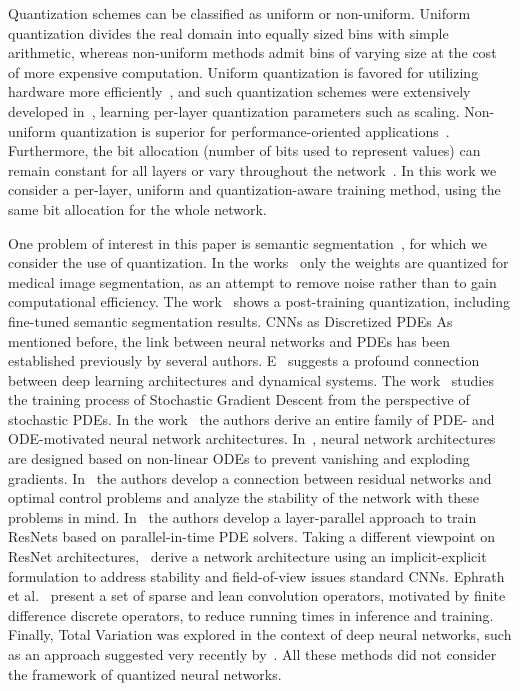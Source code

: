\documentclass[reqno]{amsart}
\makeatletter
\def\paragraph{\@startsection{paragraph}{4}%
  \z@\z@{-\fontdimen2\font}%
  {\normalfont\bfseries}}
\makeatother
\begin{document}
Quantization schemes can be classified as uniform or non-uniform. Uniform quantization divides the real domain into equally sized bins with simple arithmetic, whereas non-uniform methods admit bins of varying size at the cost of more expensive computation. Uniform quantization is favored for utilizing hardware more efficiently~\cite{han2016deep,yin2019blended}, and such quantization schemes were extensively developed in~\cite{drfn,zhang2018lqnets,choi2018pact,jin2020scaleadjusted}, learning per-layer quantization parameters such as scaling.
Non-uniform quantization is superior for performance-oriented applications~\cite{li2019apot,jung2019learning}. Furthermore, the bit allocation (number of bits used to represent values) can remain constant for all layers or vary throughout the network~\cite{bodner2021gradfreebits}. In this work we consider a per-layer, uniform and quantization-aware training method, using the same bit allocation for the whole network.

One problem of interest in this paper is semantic segmentation~\cite{chen2017atrous}, for which we consider the use of quantization. In the works~\cite{uhlich2020mpd, xu2018biomedical} only the weights are quantized for medical image segmentation, as an attempt to remove noise rather than to gain computational efficiency. The work~\cite{yuang2021zaq} shows a post-training quantization, including fine-tuned semantic segmentation results.
\bigskip
\paragraph{CNNs as Discretized PDEs}
As mentioned before, the link between neural networks and PDEs has been established previously by several authors. E~\cite{E2017} suggests a profound connection between deep learning architectures and dynamical systems. The work~\cite{ChaudhariEtAl2017} studies the training process of Stochastic Gradient Descent from the perspective of stochastic PDEs. In the work~\cite{ruthotto2019deep} the authors derive an entire family of PDE- and ODE-motivated neural network architectures. In~\cite{HaberRuthotto2017}, neural network architectures are designed based on non-linear ODEs to prevent vanishing and exploding gradients. 
In~\cite{zhang2020forward} the authors develop a connection between residual networks and optimal control problems and analyze the stability of the network with these problems in mind. In~\cite{gunther2020layer} the authors develop a layer-parallel approach to train ResNets based on parallel-in-time PDE solvers. Taking a different viewpoint on ResNet architectures,~\cite{haber2019imexnet} derive a network architecture using an implicit-explicit formulation to address stability and field-of-view issues standard CNNs. Ephrath et al.~\cite{ephrath2020leanconvnets} present a set of sparse and lean convolution operators, motivated by finite difference discrete operators, to reduce running times in inference and training. Finally, Total Variation was explored in the context of deep neural networks, such as an approach suggested very recently by~\cite{alt2021connections}. All these methods did not consider the framework of quantized neural networks. 
\bigskip
\end{document}

